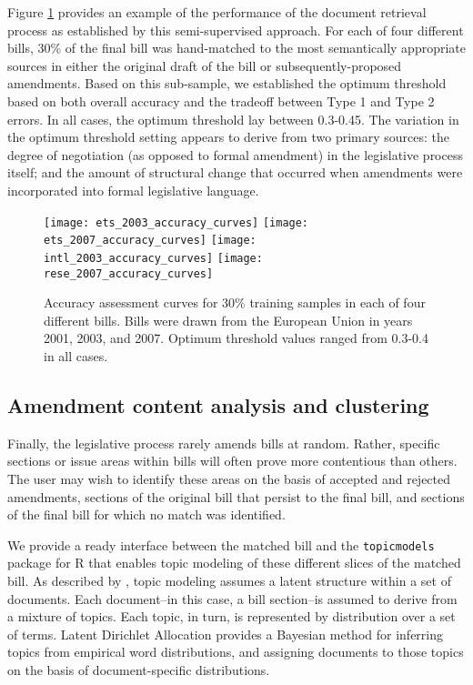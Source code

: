 \documentclass[11pt]{article}
\begin{document}
Figure \ref{fig:bill-accuracy-curves} provides an example of the
performance of the document retrieval process as established by this
semi-supervised approach. For each of four different bills, 30\% of
the final bill was hand-matched to the most semantically appropriate
sources in either the original draft of the bill or
subsequently-proposed amendments. Based on this sub-sample, we
established the optimum threshold based on both overall accuracy and
the tradeoff between Type 1 and Type 2 errors. In all cases, the
optimum threshold lay between 0.3-0.45. The variation in the optimum
threshold setting appears to derive from two primary sources: the
degree of negotiation (as opposed to formal amendment) in the
legislative process itself; and the amount of structural change that
occurred when amendments were incorporated into formal legislative language.

\begin{figure}[ht]
  \centering
  \texttt{[image: ets\_2003\_accuracy\_curves]}
  \texttt{[image: ets\_2007\_accuracy\_curves]}
  \texttt{[image: intl\_2003\_accuracy\_curves]}
  \texttt{[image: rese\_2007\_accuracy\_curves]}
  \caption{Accuracy assessment curves for 30\% training samples in
    each of four different bills. Bills were drawn from the European
    Union in years 2001, 2003, and 2007. Optimum threshold values
    ranged from 0.3-0.4 in all cases.}
  \label{fig:bill-accuracy-curves}
\end{figure}

\subsection{Amendment content analysis and clustering}
\label{sec:amendm-cont-analys}

Finally, the legislative process rarely amends bills at
random. Rather, specific sections or issue areas within bills will
often prove more contentious than others. The user may wish to
identify these areas on the basis of accepted and rejected amendments,
sections of the original bill that persist to the final bill, and
sections of the final bill for which no match was identified. 

We provide a ready interface between the matched bill and the
\texttt{topicmodels} package for R that enables topic modeling of
these different slices of the matched bill. As described by
\cite{blei2003latent}, topic modeling assumes a latent
structure within a set of documents. Each document--in this case, a
bill section--is assumed to derive from a mixture of topics. Each
topic, in turn, is represented by distribution over a
set of terms. Latent Dirichlet Allocation provides a Bayesian method
for inferring topics from empirical word distributions, and assigning
documents to those topics on the basis of document-specific
distributions. 
\end{document}
